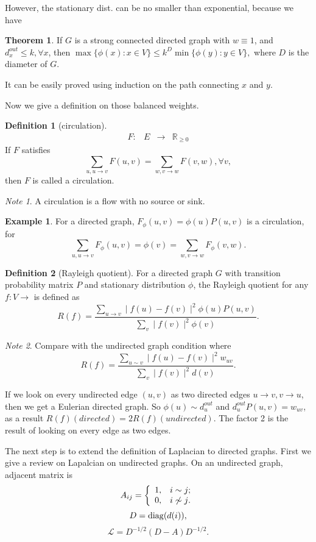 \documentclass[twoside]{article}
\theoremstyle{definition}
\newtheorem{thm}{Theorem}[section]
\newenvironment{map}{\[\begin{array}{cccc}} {\end{array}\]}
\theoremstyle{definition}
\newtheorem*{defn}{Definition}
\newtheorem*{exmp}{Example}
\theoremstyle{remark}
\newtheorem*{note}{Note}
\def\R{{\mathbb R}}
\def\L{{\mathcal L}}
\def\diag{{\rm diag}}
\begin{document}
  However, the stationary dist. can be no smaller than exponential, because we have
  \begin{thm}
  If $G$ is a strong connected directed graph with $w\equiv 1$, and $d^{out}_{x}\leq k,\forall x$, then $\max\{\phi(x):x\in V\}\leq k^D\min\{\phi(y):y\in V\},$ where $D$ is the diameter of $G$.
  \end{thm}
  It can be easily proved using induction on the path connecting $x$ and $y$.

  Now we give a definition on those balanced weights.
  \begin{defn}[circulation]
  \begin{map}
  F: & E & \rightarrow & \R_{\geq 0}
  \end{map}
  If $F$ satisfies
  \[\sum_{u,u\rightarrow v} F(u,v)=\sum_{w,v\rightarrow w} F(v,w),\forall v,\]
  then $F$ is called a circulation.
  \end{defn}
  \begin{note}
  A circulation is a flow with no source or sink.
  \end{note}

  \begin{exmp}
  For a directed graph, $F_\phi(u,v)=\phi(u)P(u,v)$ is a circulation, for
  \[\sum_{u,u\rightarrow v} F_\phi(u,v)=\phi(v)=\sum_{w,v\rightarrow w} F_\phi(v,w).\]
  \end{exmp}

  \begin{defn}[Rayleigh quotient]
  For a directed graph $G$ with transition probability matrix $P$ and stationary distribution $\phi$, the Rayleigh quotient for any $f:V\rightarrow $ is defined as
  \[R(f)=\frac{\sum_{u\rightarrow v} \mid f(u)-f(v) \mid^2 \phi(u)P(u,v)} {\sum_{v} \mid f(v)\mid^2 \phi(v)}.\]
  \end{defn}
  \begin{note}
  Compare with the undirected graph condition where
  \[R(f)=\frac{\sum_{u\sim v} \mid f(u)-f(v) \mid^2 w_{uv}} {\sum_{v} \mid f(v)\mid^2 d(v)}.\]

  If we look on every undirected edge $(u,v)$ as two directed edges $u\rightarrow v, v\rightarrow u$, then we get a Eulerian directed graph.
  So $\phi(u)\sim d^{out}_{u}$ and $d^{out}_uP(u,v)=w_{uv}$, as a result $R(f)(directed) =2R(f)(undirected)$. The factor 2 is the result of looking on every edge as two edges.
  \end{note}

  The next step is to extend the definition of Laplacian to directed graphs. First we give a review on Lapalcian on undirected graphs.
  On an undirected graph, adjacent matrix is
  \[A_{ij}=\left\{
                 \begin{array}{ll}
                       1, & \hbox{$i \sim j$;} \\
                       0, & \hbox{$i \not\sim j$.}
                 \end{array}
           \right.\]
  \[D=\diag(d(i)),\]
  \[\L=D^{-1/2}(D-A)D^{-1/2}.\]
\end{document}
